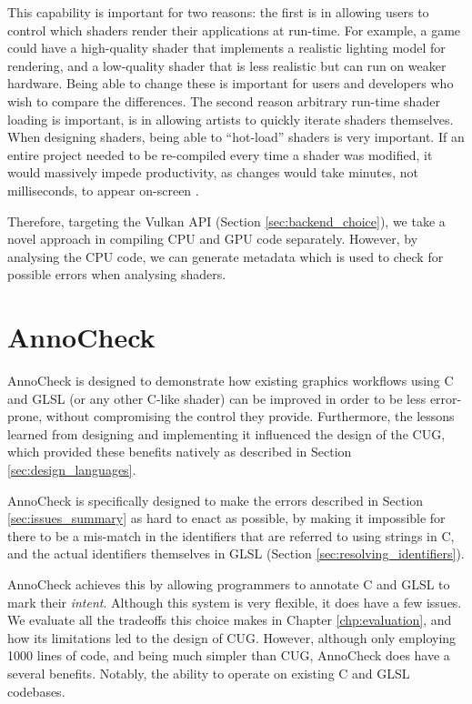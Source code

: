 \documentclass[a4paper,12pt,twoside,openright]{report}
\begin{document}
This capability is important for two reasons: the first is in allowing users to
control which shaders render their applications at run-time. For example, a
game could have a high-quality shader that implements a realistic lighting
model for rendering, and a low-quality shader that is less realistic but can
run on weaker hardware. Being able to change these is important for users and
developers who wish to compare the differences. The second reason arbitrary
run-time shader loading is important, is in allowing artists to quickly iterate
shaders themselves. When designing shaders, being able to ``hot-load'' shaders
is very important. If an entire project needed to be re-compiled every time a
shader was modified, it would massively impede productivity, as changes would
take minutes, not milliseconds, to appear on-screen \cite{HotloadShader}.

Therefore, targeting the Vulkan API (Section \ref{sec:backend_choice}), we take
a novel approach in compiling CPU and GPU code separately. However, by
analysing the CPU code, we can generate metadata which is used to check for
possible errors when analysing shaders.

\section{AnnoCheck}

\label{sec:design_annotation_processor}

AnnoCheck is designed to demonstrate how existing graphics workflows using C
and GLSL (or any other C-like shader) can be improved in order to be less
error-prone, without compromising the control they provide. Furthermore, the
lessons learned from designing and implementing it influenced the design of the
CUG, which provided these benefits natively as described in Section
\ref{sec:design_languages}.

AnnoCheck is specifically designed to make the errors described in Section
\ref{sec:issues_summary} as hard to enact as possible, by making it impossible
for there to be a mis-match in the identifiers that are referred to using
strings in C, and the actual identifiers themselves in GLSL (Section
\ref{sec:resolving_identifiers}).

AnnoCheck achieves this by allowing programmers to annotate C and GLSL to mark
their \textit{intent}. Although this system is very flexible, it does have a
few issues. We evaluate all the tradeoffs this choice makes in Chapter
\ref{chp:evaluation}, and how its limitations led to the design of CUG.
However, although only employing 1000 lines of code, and being much simpler
than CUG, AnnoCheck does have a several benefits. Notably, the ability to
operate on existing C and GLSL codebases.
\end{document}
